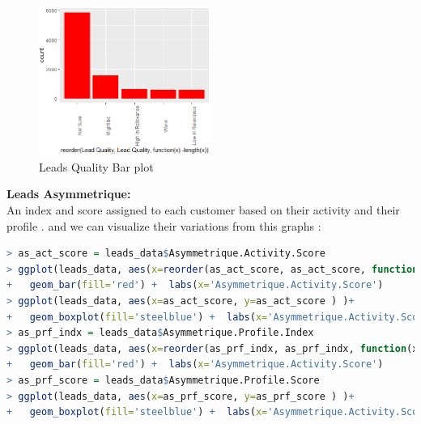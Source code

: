 \begin{figure}[ht]
    \centering
    \includegraphics[width=0.5\textwidth]{assets/lead_quality2.png}
    \caption{ Leads Quality Bar plot}
\end{figure}
\textbf{Leads Asymmetrique: }\\
An index and score assigned to each customer based on their activity and their profile . and we can visualize their variations from this graphs : 
\begin{lstlisting}[language=R]
> as_act_score = leads_data$Asymmetrique.Activity.Score 
> ggplot(leads_data, aes(x=reorder(as_act_score, as_act_score, function(x)-length(x))))
+   geom_bar(fill='red') +  labs(x='Asymmetrique.Activity.Score')
> ggplot(leads_data, aes(x=as_act_score, y=as_act_score ) )+
+   geom_boxplot(fill='steelblue') +  labs(x='Asymmetrique.Activity.Score') +coord_flip()
> as_prf_indx = leads_data$Asymmetrique.Profile.Index 
> ggplot(leads_data, aes(x=reorder(as_prf_indx, as_prf_indx, function(x)-length(x)))) +
+   geom_bar(fill='red') +  labs(x='Asymmetrique.Activity.Score')
> as_prf_score = leads_data$Asymmetrique.Profile.Score
> ggplot(leads_data, aes(x=as_prf_score, y=as_prf_score ) )+
+   geom_boxplot(fill='steelblue') +  labs(x='Asymmetrique.Activity.Score') + coord_flip()
\end{lstlisting}
